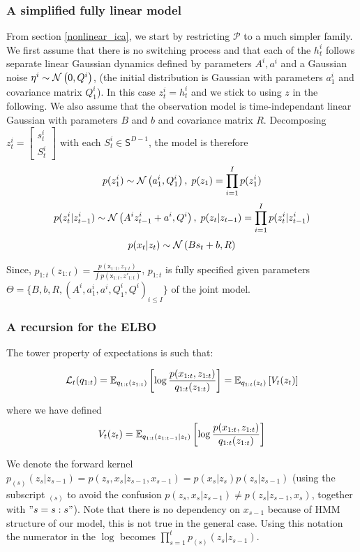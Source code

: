 \documentclass{article}
\begin{document}
\subsubsection*{A simplified fully linear model}
From section \ref{nonlinear_ica}, we start by restricting $\mathcal{P}$ to a much simpler family. We first assume that there is no switching process and that each of the $h_t^i$ follows separate linear Gaussian dynamics defined by parameters $A^i,a^i$ and a Gaussian noise $\eta^i \sim \mathcal{N}\left( 0, Q^i \right)$, (the initial distribution is Gaussian with parameters $a_1^i$ and covariance matrix $Q_1^i$). In this case $z_t^i = h_t^i$ and we stick to using $z$ in the following. We also assume that the observation model is time-independant linear Gaussian with parameters $B$ and $b$ and covariance matrix $R$.
Decomposing $z_t^i = \begin{bmatrix}
    s_t^i \\
    S_t^i
    \end{bmatrix}$ 
with each $S_t^i \in \mathsf{S}^{D-1}$, the model is therefore
$$p(z_1^i) \sim \mathcal{N}\left( a_1^i, Q_1^i \right), \; p(z_1) = \prod_{i=1}^I p(z_1^i)$$
$$p(z_t^i|z_{t-1}^i) \sim \mathcal{N}\left( A^i z_{t-1}^i + a^i, Q^i \right), \; p(z_t|z_{t-1}) = \prod_{i=1}^I p(z_t^i|z_{t-1}^i)$$
$$p(x_t|z_t) \sim \mathcal{N}\left( B s_t + b, R \right)$$

Since, $p_{1:t}( z_{1:t}) = \frac{p(\mathsf{x}_{1:t},  z_{1:t})}{\int p(\mathsf{x}_{1:t},  z'_{1:t})}$, $p_{1:t}$ is fully specified given parameters $\Theta = \{B, b, R, (A^i, a_1^i, a^i, Q_1^i, Q^i)_{i \leq I}\}$ of the joint model. 
\subsubsection*{A recursion for the ELBO}
The tower property of expectations is such that: 

\begin{equation}
    \mathcal{L}_t(q_{1:t}) = \mathbb{E}_{q_{1:t}( z_{1:t})}\left[\log \frac{p(x_{1:t},z_{1:t})}{q_{1:t}(z_{1:t})}\right] = \mathbb{E}_{q_{1:t}( z_t)}\left[V_t(z_{t})\right]
\end{equation}

where we have defined $$V_t(z_t) = \mathbb{E}_{q_{1:t}( z_{1:t-1}|z_t)}\left[\log \frac{p(x_{1:t},z_{1:t})}{q_{1:t}(z_{1:t})}\right]$$

We denote the forward kernel $p_{(s)}(z_s|z_{s-1}) = p(z_s,x_s|z_{s-1}, x_{s-1}) = p(x_s|z_s)p(z_s|z_{s-1})$ (using the subscript $_{(s)}$ to avoid the confusion $p(z_s,x_s|z_{s-1}) \neq p(z_s|z_{s-1},x_s)$, together with $"s = s:s"$). Note that there is no dependency on $x_{s-1}$ because of HMM structure of our model, this is not true in the general case. Using this notation the numerator in the $\log$ becomes $\prod_{s=1}^t p_{(s)}( z_s|z_{s-1})$. 
\end{document}
